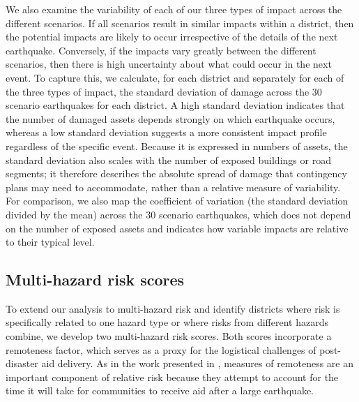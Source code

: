 \documentclass[nhess, manuscript]{copernicus}
\begin{document}
We also examine the variability of each of our three types of impact across the different scenarios. If all scenarios result in similar impacts within a district, then the potential impacts are likely to occur irrespective of the details of the next earthquake. Conversely, if the impacts vary greatly between the different scenarios, then there is high uncertainty about what could occur in the next event. To capture this, we calculate, for each district and separately for each of the three types of impact, the standard deviation of damage across the 30 scenario earthquakes for each district. A high standard deviation indicates that the number of damaged assets depends strongly on which earthquake occurs, whereas a low standard deviation suggests a more consistent impact profile regardless of the specific event. Because it is expressed in numbers of assets, the standard deviation also scales with the number of exposed buildings or road segments; it therefore describes the absolute spread of damage that contingency plans may need to accommodate, rather than a relative measure of variability. For comparison, we also map the coefficient of variation (the standard deviation divided by the mean) across the 30 scenario earthquakes, which does not depend on the number of exposed assets and indicates how variable impacts are relative to their typical level.

\subsection{Multi-hazard risk scores}
\label{sec:riskscores}

To extend our analysis to multi-hazard risk and identify districts where risk is specifically related to one hazard type or where risks from different hazards combine, we develop two multi-hazard risk scores. Both scores incorporate a remoteness factor, which serves as a proxy for the logistical challenges of post-disaster aid delivery. As in the work presented in \citet{Robinson2018}, measures of remoteness are an important component of relative risk because they attempt to account for the time it will take for communities to receive aid after a large earthquake.
\end{document}
